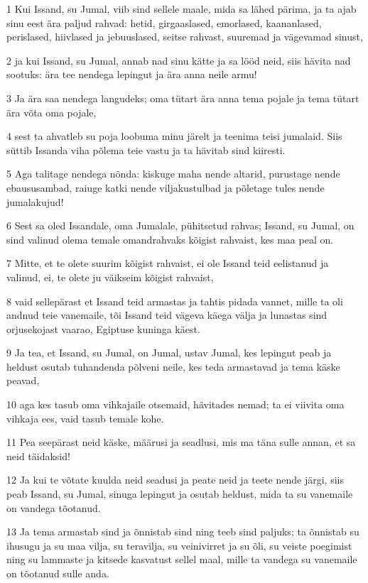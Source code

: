 \par 1 Kui Issand, su Jumal, viib sind sellele maale, mida sa lähed pärima, ja ta ajab sinu eest ära paljud rahvad: hetid, girgaaslased, emorlased, kaananlased, perislased, hiivlased ja jebuuslased, seitse rahvast, suuremad ja vägevamad sinust,
\par 2 ja kui Issand, su Jumal, annab nad sinu kätte ja sa lööd neid, siis hävita nad sootuks: ära tee nendega lepingut ja ära anna neile armu!
\par 3 Ja ära saa nendega langudeks; oma tütart ära anna tema pojale ja tema tütart ära võta oma pojale,
\par 4 sest ta ahvatleb su poja loobuma minu järelt ja teenima teisi jumalaid. Siis süttib Issanda viha põlema teie vastu ja ta hävitab sind kiiresti.
\par 5 Aga talitage nendega nõnda: kiskuge maha nende altarid, purustage nende ebaususambad, raiuge katki nende viljakustulbad ja põletage tules nende jumalakujud!
\par 6 Sest sa oled Issandale, oma Jumalale, pühitsetud rahvas; Issand, su Jumal, on sind valinud olema temale omandrahvaks kõigist rahvaist, kes maa peal on.
\par 7 Mitte, et te olete suurim kõigist rahvaist, ei ole Issand teid eelistanud ja valinud, ei, te olete ju väikseim kõigist rahvaist,
\par 8 vaid sellepärast et Issand teid armastas ja tahtis pidada vannet, mille ta oli andnud teie vanemaile, tõi Issand teid vägeva käega välja ja lunastas sind orjusekojast vaarao, Egiptuse kuninga käest.
\par 9 Ja tea, et Issand, su Jumal, on Jumal, ustav Jumal, kes lepingut peab ja heldust osutab tuhandenda põlveni neile, kes teda armastavad ja tema käske peavad,
\par 10 aga kes tasub oma vihkajaile otsemaid, hävitades nemad; ta ei viivita oma vihkaja ees, vaid tasub temale kohe.
\par 11 Pea seepärast neid käske, määrusi ja seadlusi, mis ma täna sulle annan, et sa neid täidaksid!
\par 12 Ja kui te võtate kuulda neid seadusi ja peate neid ja teete nende järgi, siis peab Issand, su Jumal, sinuga lepingut ja osutab heldust, mida ta su vanemaile on vandega tõotanud.
\par 13 Ja tema armastab sind ja õnnistab sind ning teeb sind paljuks; ta õnnistab su ihusugu ja su maa vilja, su teravilja, su veinivirret ja su õli, su veiste poegimist ning su lammaste ja kitsede kasvatust sellel maal, mille ta vandega su vanemaile on tõotanud sulle anda.
